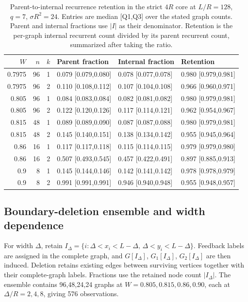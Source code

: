 \documentclass[11pt]{article}
\begin{document}
\begin{table}[H]\centering\small
\caption{Parent-to-internal recurrence retention in the strict $4R$ core at $L/R=128$, $q=7$, $\sigma R^2=24$. Entries are median [Q1,Q3] over the stated graph counts. Parent and internal fractions use $|I|$ as their denominator. Retention is the per-graph internal recurrent count divided by its parent recurrent count, summarized after taking the ratio.}\label{tab:retention}
\begin{tabular}{rrrlll}
\toprule
$W$ & $n$ & $k$ & Parent fraction & Internal fraction & Retention \\
\midrule
0.7975 & 96 & 1 & 0.079 [0.079,0.080] & 0.078 [0.077,0.078] & 0.980 [0.979,0.981] \\
0.7975 & 96 & 2 & 0.110 [0.108,0.112] & 0.107 [0.104,0.108] & 0.966 [0.960,0.971] \\
0.805 & 96 & 1 & 0.084 [0.083,0.084] & 0.082 [0.081,0.082] & 0.980 [0.979,0.981] \\
0.805 & 96 & 2 & 0.122 [0.120,0.126] & 0.117 [0.114,0.121] & 0.962 [0.954,0.967] \\
0.815 & 48 & 1 & 0.089 [0.089,0.090] & 0.087 [0.087,0.088] & 0.980 [0.979,0.981] \\
0.815 & 48 & 2 & 0.145 [0.140,0.151] & 0.138 [0.134,0.142] & 0.955 [0.945,0.964] \\
0.86 & 16 & 1 & 0.117 [0.117,0.118] & 0.115 [0.114,0.115] & 0.979 [0.979,0.980] \\
0.86 & 16 & 2 & 0.507 [0.493,0.545] & 0.457 [0.422,0.491] & 0.897 [0.885,0.913] \\
0.9 & 8 & 1 & 0.145 [0.144,0.146] & 0.142 [0.141,0.142] & 0.978 [0.978,0.979] \\
0.9 & 8 & 2 & 0.991 [0.991,0.991] & 0.946 [0.940,0.948] & 0.955 [0.948,0.957] \\
\bottomrule\end{tabular}\end{table}

\subsection{Boundary-deletion ensemble and width dependence}
For width $\Delta$, retain $I_\Delta=\{i:\Delta<x_i<L-\Delta,\,\Delta<y_i<L-\Delta\}$. Feedback labels are assigned in the complete graph, and $G[I_\Delta]$, $G_1[I_\Delta]$, $G_2[I_\Delta]$ are then induced. Deletion retains existing edges between surviving vertices together with their complete-graph labels. Fractions use the retained node count $|I_\Delta|$. The ensemble contains 96,48,24,24 graphs at $W=0.805,0.815,0.86,0.90$, each at $\Delta/R=2,4,8$, giving 576 observations.
\end{document}
